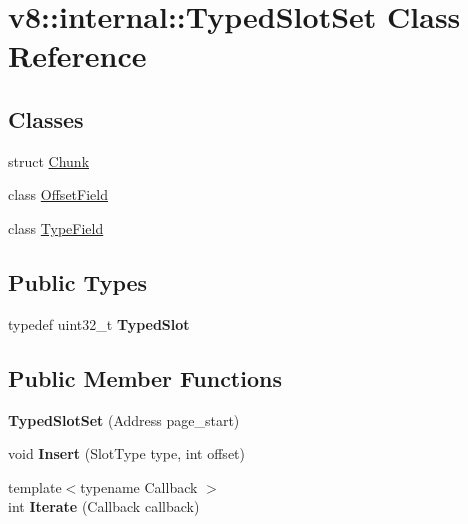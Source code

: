 \hypertarget{classv8_1_1internal_1_1_typed_slot_set}{}\section{v8\+:\+:internal\+:\+:Typed\+Slot\+Set Class Reference}
\label{classv8_1_1internal_1_1_typed_slot_set}
\subsection*{Classes}
\begin{DoxyCompactItemize}
\item 
struct \hyperlink{structv8_1_1internal_1_1_typed_slot_set_1_1_chunk}{Chunk}
\item 
class \hyperlink{classv8_1_1internal_1_1_typed_slot_set_1_1_offset_field}{Offset\+Field}
\item 
class \hyperlink{classv8_1_1internal_1_1_typed_slot_set_1_1_type_field}{Type\+Field}
\end{DoxyCompactItemize}
\subsection*{Public Types}
\begin{DoxyCompactItemize}
\item 
typedef uint32\+\_\+t {\bfseries Typed\+Slot}\hypertarget{classv8_1_1internal_1_1_typed_slot_set_a257611ec9ea66a072821e0c3cb22eb7b}{}\label{classv8_1_1internal_1_1_typed_slot_set_a257611ec9ea66a072821e0c3cb22eb7b}

\end{DoxyCompactItemize}
\subsection*{Public Member Functions}
\begin{DoxyCompactItemize}
\item 
{\bfseries Typed\+Slot\+Set} (Address page\+\_\+start)\hypertarget{classv8_1_1internal_1_1_typed_slot_set_a317b8c8a66c92042fd84c36a691e4d6a}{}\label{classv8_1_1internal_1_1_typed_slot_set_a317b8c8a66c92042fd84c36a691e4d6a}

\item 
void {\bfseries Insert} (Slot\+Type type, int offset)\hypertarget{classv8_1_1internal_1_1_typed_slot_set_a4c7d18e4d975d8f636071f7d5d1076b7}{}\label{classv8_1_1internal_1_1_typed_slot_set_a4c7d18e4d975d8f636071f7d5d1076b7}

\item 
{\footnotesize template$<$typename Callback $>$ }\\int {\bfseries Iterate} (Callback callback)\hypertarget{classv8_1_1internal_1_1_typed_slot_set_a1b5b128e40b3d2632ffa823318c3a5cc}{}\label{classv8_1_1internal_1_1_typed_slot_set_a1b5b128e40b3d2632ffa823318c3a5cc}

\end{DoxyCompactItemize}
